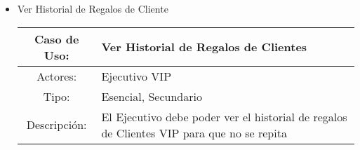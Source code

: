 \begin{itemize}
	\item Ver Historial de Regalos de Cliente\\
		\begin{tabular}{|c|p{11cm}|}\hline
			Caso de Uso: & Ver Historial de Regalos de Clientes\\\hline
			Actores: &Ejecutivo VIP\\\hline
			Tipo: & Esencial, Secundario\\\hline
			Descripción: &El Ejecutivo debe poder ver el historial de regalos de Clientes VIP para que no se repita\\\hline
		\end{tabular}
\end{itemize}
